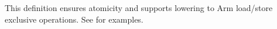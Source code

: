 
This definition ensures atomicity and supports lowering to Arm load/store
exclusive operations.  See \cite{DBLP:journals/pacmpl/JagadeesanJR20} for examples.

